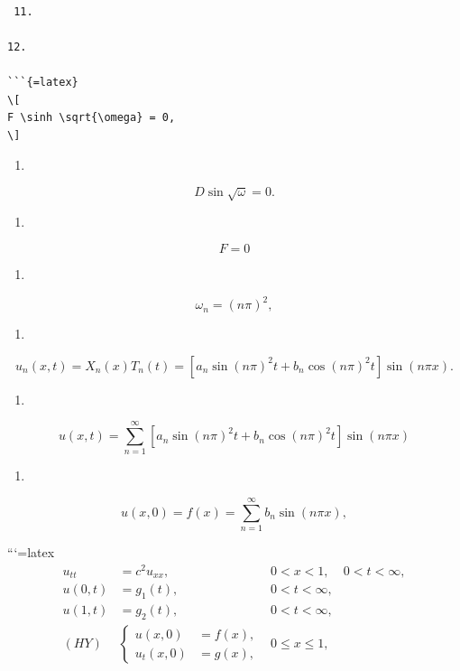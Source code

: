 \documentclass[
  ukrainian,
]{article}
\providecommand{\tightlist}{%
  \setlength{\itemsep}{0pt}\setlength{\parskip}{0pt}}
\begin{document}
\begin{verbatim}

 11.

12.

```{=latex}
\[
F \sinh \sqrt{\omega} = 0,
\]
\end{verbatim}

\begin{enumerate}
\def\labelenumi{\arabic{enumi}.}
\setcounter{enumi}{12}
\tightlist
\item
\end{enumerate}

\[
D \sin \sqrt{\omega} = 0.
\]

\begin{enumerate}
\def\labelenumi{\arabic{enumi}.}
\setcounter{enumi}{13}
\tightlist
\item
\end{enumerate}

\[
F = 0
\]

\begin{enumerate}
\def\labelenumi{\arabic{enumi}.}
\setcounter{enumi}{14}
\tightlist
\item
\end{enumerate}

\[
\omega_n = (n\pi)^2,
\]

\begin{enumerate}
\def\labelenumi{\arabic{enumi}.}
\setcounter{enumi}{15}
\tightlist
\item
\end{enumerate}

\[
u_n(x, t) = X_n(x) T_n(t) = [a_n \sin(n\pi)^2 t + b_n \cos(n\pi)^2 t] \sin(n\pi x).
\]

\begin{enumerate}
\def\labelenumi{\arabic{enumi}.}
\setcounter{enumi}{16}
\tightlist
\item
\end{enumerate}

\[
u(x, t) = \sum_{n=1}^{\infty} \left[ a_n \sin(n\pi)^2 t + b_n \cos(n\pi)^2 t \right] \sin(n\pi x)
\]

\begin{enumerate}
\def\labelenumi{\arabic{enumi}.}
\setcounter{enumi}{17}
\tightlist
\item
\end{enumerate}

\[
u(x, 0) = f(x) = \sum_{n=1}^{\infty} b_n \sin(n\pi x),
\]

```{=latex}
\[
\begin{aligned} u_{tt} &= c^2 u_{xx}, & 0 < x < 1, & 0 < t < \infty, \\ u(0, t) &= g_1(t), & 0 < t < \infty, \\ u(1, t) &= g_2(t), & 0 < t < \infty, \\ (HY) &\begin{cases} u(x, 0) &= f(x), \\ u_t(x, 0) &= g(x), \end{cases} & 0 \leqslant x \leqslant 1, \end{aligned}
\]
\end{document}
